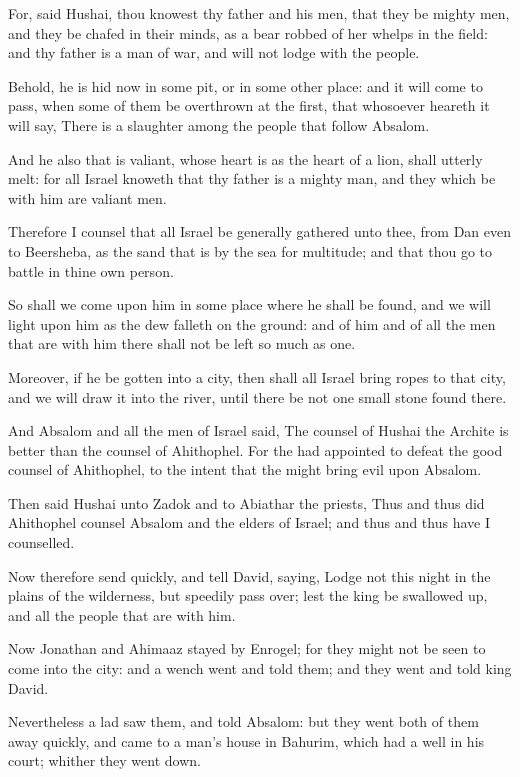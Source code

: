 \Verse For, said Hushai, thou knowest thy father and his men, that they be mighty men, and they be chafed in their minds, as a bear robbed of her whelps in the field: and thy father is a man of war, and will not lodge with the people.

\Verse Behold, he is hid now in some pit, or in some other place: and it will come to pass, when some of them be overthrown at the first, that whosoever heareth it will say, There is a slaughter among the people that follow Absalom.

\Verse And he also that is valiant, whose heart is as the heart of a lion, shall utterly melt: for all Israel knoweth that thy father is a mighty man, and they which be with him are valiant men.

\Verse Therefore I counsel that all Israel be generally gathered unto thee, from Dan even to Beersheba, as the sand that is by the sea for multitude; and that thou go to battle in thine own person.

\Verse So shall we come upon him in some place where he shall be found, and we will light upon him as the dew falleth on the ground: and of him and of all the men that are with him there shall not be left so much as one.

\Verse Moreover, if he be gotten into a city, then shall all Israel bring ropes to that city, and we will draw it into the river, until there be not one small stone found there.

\Verse And Absalom and all the men of Israel said, The counsel of Hushai the Archite is better than the counsel of Ahithophel. For the \LORD had appointed to defeat the good counsel of Ahithophel, to the intent that the \LORD might bring evil upon Absalom.

\Verse Then said Hushai unto Zadok and to Abiathar the priests, Thus and thus did Ahithophel counsel Absalom and the elders of Israel; and thus and thus have I counselled.

\Verse Now therefore send quickly, and tell David, saying, Lodge not this night in the plains of the wilderness, but speedily pass over; lest the king be swallowed up, and all the people that are with him.

\Verse Now Jonathan and Ahimaaz stayed by Enrogel; for they might not be seen to come into the city: and a wench went and told them; and they went and told king David.

\Verse Nevertheless a lad saw them, and told Absalom: but they went both of them away quickly, and came to a man's house in Bahurim, which had a well in his court; whither they went down.

